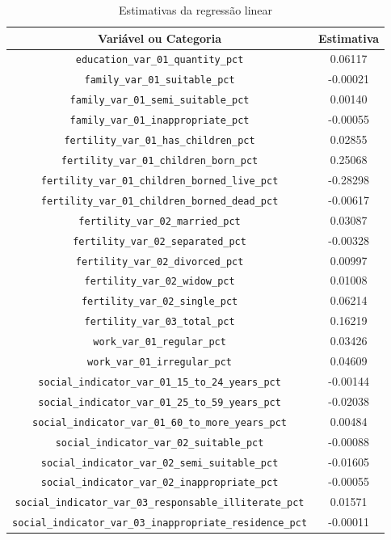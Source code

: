 
\begin{table}[h]
\centering
\caption{Estimativas da regressão linear}
\label{tab:cap3_estimativa_reg_lin}
\begin{adjustbox}{width=\textwidth}
\begin{tabular}{cc}
Variável ou Categoria & Estimativa \\
\hline
\verb|education_var_01_quantity_pct| &  0.06117 \\
\verb|family_var_01_suitable_pct|  & -0.00021 \\
\verb|family_var_01_semi_suitable_pct| &  0.00140 \\
\verb|family_var_01_inappropriate_pct|  & -0.00055 \\
\verb|fertility_var_01_has_children_pct| &  0.02855 \\
\verb|fertility_var_01_children_born_pct| &  0.25068 \\
\verb|fertility_var_01_children_borned_live_pct|  & -0.28298 \\
\verb|fertility_var_01_children_borned_dead_pct|  & -0.00617 \\
\verb|fertility_var_02_married_pct| &  0.03087 \\
\verb|fertility_var_02_separated_pct|  & -0.00328 \\
\verb|fertility_var_02_divorced_pct| &  0.00997 \\
\verb|fertility_var_02_widow_pct| &  0.01008 \\
\verb|fertility_var_02_single_pct| &  0.06214 \\
\verb|fertility_var_03_total_pct| &  0.16219 \\
\verb|work_var_01_regular_pct| &  0.03426 \\
\verb|work_var_01_irregular_pct| &  0.04609 \\
\verb|social_indicator_var_01_15_to_24_years_pct|  & -0.00144 \\
\verb|social_indicator_var_01_25_to_59_years_pct|  & -0.02038 \\
\verb|social_indicator_var_01_60_to_more_years_pct| &  0.00484 \\
\verb|social_indicator_var_02_suitable_pct|  & -0.00088 \\
\verb|social_indicator_var_02_semi_suitable_pct|  & -0.01605 \\
\verb|social_indicator_var_02_inappropriate_pct|  & -0.00055 \\
\verb|social_indicator_var_03_responsable_illiterate_pct| &  0.01571 \\
\verb|social_indicator_var_03_inappropriate_residence_pct|  & -0.00011 \\

\end{tabular}
\end{adjustbox}
\end{table}
